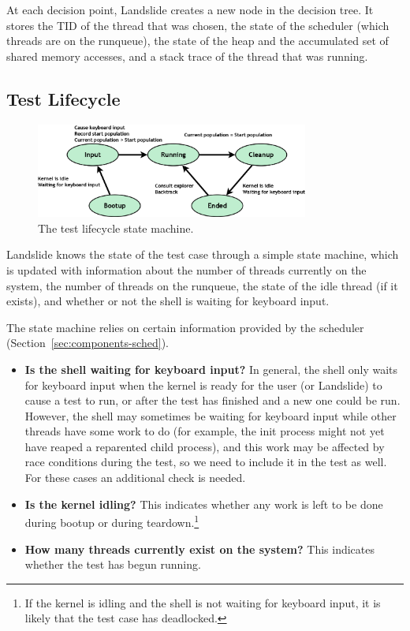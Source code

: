 At each decision point, Landslide creates a new node in the decision tree. It stores the TID of the thread that was chosen, the state of the scheduler (which threads are on the runqueue), the state of the heap and the accumulated set of shared memory accesses, and a stack trace of the thread that was running.

\subsection{Test Lifecycle}
\label{sec:components-test}

\begin{figure}[h]
	\begin{center}
		\includegraphics[width=0.8\textwidth]{teststate.png}
	\end{center}
	\caption{The test lifecycle state machine.}
	\label{fig:teststate}
\end{figure}
Landslide knows the state of the test case through a simple state machine, which is updated with information about the number of threads currently on the system, the number of threads on the runqueue, the state of the idle thread (if it exists), and whether or not the shell is waiting for keyboard input.

The state machine relies on certain information provided by the scheduler (Section~\ref{sec:components-sched}).

\begin{itemize}
	\item {\bf Is the shell waiting for keyboard input?} In general, the shell only waits for keyboard input when the kernel is ready for the user (or Landslide) to cause a test to run, or after the test has finished and a new one could be run.
		However, the shell may sometimes be waiting for keyboard input while other threads have some work to do (for example, the init process might not yet have reaped a reparented child process), and this work may be affected by race conditions during the test, so we need to include it in the test as well. For these cases an additional check is needed.
	\item {\bf Is the kernel idling?} This indicates whether any work is left to be done during bootup or during teardown.\footnote{
		If the kernel is idling and the shell is not waiting for keyboard input, it is likely that the test case has deadlocked.}
	\item {\bf How many threads currently exist on the system?} This indicates whether the test has begun running.
\end{itemize}

